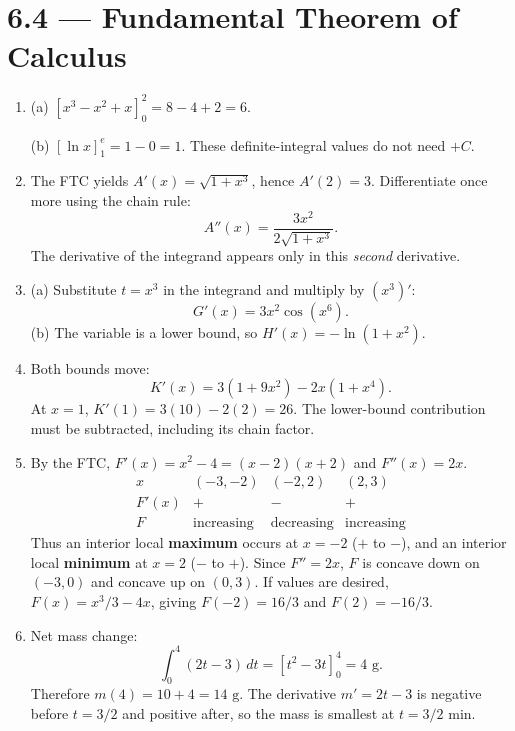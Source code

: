 \documentclass[11pt]{article}
\newcommand{\topic}[2]{\clearpage\section*{#1 --- #2}}
\begin{document}
\topic{6.4}{Fundamental Theorem of Calculus}
\begin{enumerate}
\item (a) $[x^3-x^2+x]_0^2=8-4+2=\boxed6$.

(b) $[\ln x]_1^e=1-0=\boxed1$.
These definite-integral values do not need $+C$.
\item The FTC yields $\boxed{A'(x)=\sqrt{1+x^3}}$, hence $\boxed{A'(2)=3}$.
Differentiate once more using the chain rule:
\[
\boxed{A''(x)=\frac{3x^2}{2\sqrt{1+x^3}}}.
\]
The derivative of the integrand appears only in this \emph{second} derivative.
\item (a) Substitute $t=x^3$ in the integrand and multiply by $(x^3)'$:
\[
\boxed{G'(x)=3x^2\cos(x^6)}.
\]
(b) The variable is a lower bound, so
$\boxed{H'(x)=-\ln(1+x^2)}$.
\item Both bounds move:
\[
\boxed{K'(x)=3(1+9x^2)-2x(1+x^4)}.
\]
At $x=1$, $K'(1)=3(10)-2(2)=\boxed{26}$.
The lower-bound contribution must be subtracted, including its chain factor.
\item By the FTC, $F'(x)=x^2-4=(x-2)(x+2)$ and $F''(x)=2x$.
\[
\begin{array}{c|ccc}
x&(-3,-2)&(-2,2)&(2,3)\\\hline
F'(x)&+&-&+\\
F&\text{increasing}&\text{decreasing}&\text{increasing}
\end{array}
\]
Thus an interior local \textbf{maximum} occurs at $\boxed{x=-2}$ ($+$ to $-$), and an interior local \textbf{minimum} at $\boxed{x=2}$ ($-$ to $+$).
Since $F''=2x$, $F$ is concave down on $\boxed{(-3,0)}$ and concave up on $\boxed{(0,3)}$.
If values are desired, $F(x)=x^3/3-4x$, giving $F(-2)=16/3$ and $F(2)=-16/3$.
\item Net mass change:
\[
\int_0^4(2t-3)\,dt=[t^2-3t]_0^4=\boxed{4\text{ g}}.
\]
Therefore $\boxed{m(4)=10+4=14\text{ g}}$.
The derivative $m'=2t-3$ is negative before $t=3/2$ and positive after, so the mass is smallest at $\boxed{t=3/2\text{ min}}$.
\end{enumerate}
\end{document}
